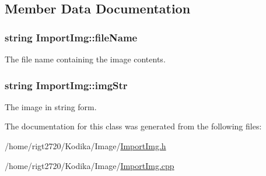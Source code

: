 \subsection{Member Data Documentation}
\hypertarget{classImportImg_a153117d9186b4d7317259ea9dd4c47b1}{
\subsubsection[{file\-Name}]{\setlength{\rightskip}{0pt plus 5cm}string Import\-Img\-::file\-Name\hspace{0.3cm}{\ttfamily [private]}}}\label{classImportImg_a153117d9186b4d7317259ea9dd4c47b1}


The file name containing the image contents. 

\hypertarget{classImportImg_a3529487bc41c4ae9a7926b09aec05305}{
\subsubsection[{img\-Str}]{\setlength{\rightskip}{0pt plus 5cm}string Import\-Img\-::img\-Str\hspace{0.3cm}{\ttfamily [private]}}}\label{classImportImg_a3529487bc41c4ae9a7926b09aec05305}


The image in string form. 



The documentation for this class was generated from the following files\-:\begin{DoxyCompactItemize}
\item 
/home/rigt2720/\-Kodika/\-Image/\hyperlink{ImportImg_8h}{Import\-Img.\-h}\item 
/home/rigt2720/\-Kodika/\-Image/\hyperlink{ImportImg_8cpp}{Import\-Img.\-cpp}\end{DoxyCompactItemize}
